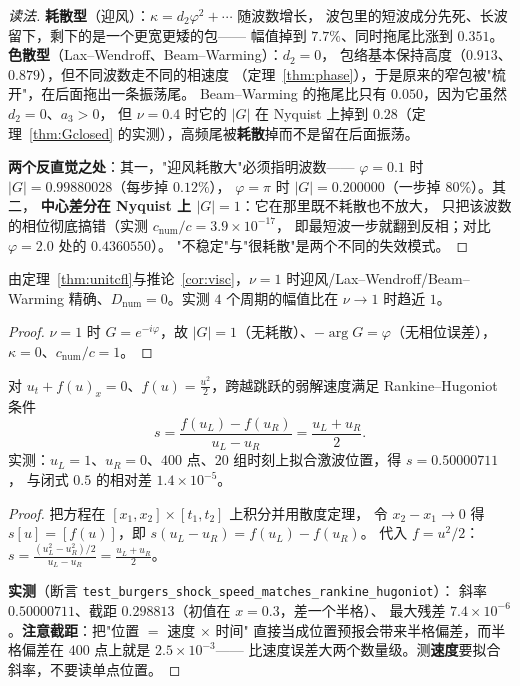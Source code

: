 \begin{proof}[读法]
\textbf{耗散型}（迎风）：$\kappa=d_2\varphi^2+\cdots$ 随波数增长，
波包里的短波成分先死、长波留下，剩下的是一个更宽更矮的包——
幅值掉到 $7.7\%$、同时拖尾比涨到 $0.351$。
\textbf{色散型}（Lax--Wendroff、Beam--Warming）：$d_2=0$，
包络基本保持高度（$0.913$、$0.879$），但不同波数走不同的相速度
（定理~\ref{thm:phase}），于是原来的窄包被"梳开"，在后面拖出一条振荡尾。
Beam--Warming 的拖尾比只有 $0.050$，因为它虽然 $d_2=0$、$a_3>0$，
但 $\nu=0.4$ 时它的 $|G|$ 在 Nyquist 上掉到 $0.28$（定理~\ref{thm:Gclosed}
的实测），高频尾被\textbf{耗散}掉而不是留在后面振荡。

\textbf{两个反直觉之处}：其一，"迎风耗散大"必须指明波数——
$\varphi=0.1$ 时 $|G|=0.99880028$（每步掉 $0.12\%$），
$\varphi=\pi$ 时 $|G|=0.200000$（一步掉 $80\%$）。其二，
\textbf{中心差分在 Nyquist 上 $|G|=1$}：它在那里既不耗散也不放大，
只把该波数的相位彻底搞错（实测 $c_{\text{num}}/c=3.9\times10^{-17}$，
即最短波一步就翻到反相；对比 $\varphi=2.0$ 处的 $0.4360550$）。
"不稳定"与"很耗散"是两个不同的失效模式。
\end{proof}

\begin{corollary}[$\nu=1$ 时误差反而变小]
\label{cor:nu1}
由定理~\ref{thm:unitcfl}与推论~\ref{cor:visc}，$\nu=1$ 时迎风/Lax--Wendroff/Beam--Warming
精确、$D_{\text{num}}=0$。实测 $4$ 个周期的幅值比在 $\nu\to1$ 时趋近 $1$。
\end{corollary}

\begin{proof}
$\nu=1$ 时 $G=e^{-i\varphi}$，故 $|G|=1$（无耗散）、$-\arg G=\varphi$（无相位误差），
$\kappa=0$、$c_{\text{num}}/c=1$。
\end{proof}

\begin{theorem}
\label{thm:rh}
对 $u_t+f(u)_x=0$、$f(u)=\tfrac{u^2}{2}$，跨越跳跃的弱解速度满足
Rankine--Hugoniot 条件
\begin{equation}
  s=\frac{f(u_L)-f(u_R)}{u_L-u_R}=\frac{u_L+u_R}{2}.
\end{equation}
实测：$u_L=1$、$u_R=0$、$400$ 点、$20$ 组时刻上拟合激波位置，得 $s=0.50000711$，
与闭式 $0.5$ 的相对差 $1.4\times10^{-5}$。
\end{theorem}

\begin{proof}
把方程在 $[x_1,x_2]\times[t_1,t_2]$ 上积分并用散度定理，
令 $x_2-x_1\to0$ 得 $s[u]=[f(u)]$，即 $s(u_L-u_R)=f(u_L)-f(u_R)$。
代入 $f=u^2/2$：$s=\tfrac{(u_L^2-u_R^2)/2}{u_L-u_R}=\tfrac{u_L+u_R}{2}$。

\textbf{实测}（断言 \texttt{test\_burgers\_shock\_speed\_matches\_rankine\_hugoniot}）：
斜率 $0.50000711$、截距 $0.298813$（初值在 $x=0.3$，差一个半格）、
最大残差 $7.4\times10^{-6}$。\textbf{注意截距}：把"位置 $=$ 速度 $\times$ 时间"
直接当成位置预报会带来半格偏差，而半格偏差在 $400$ 点上就是 $2.5\times10^{-3}$——
比速度误差大两个数量级。测\textbf{速度}要拟合斜率，不要读单点位置。
\end{proof}

